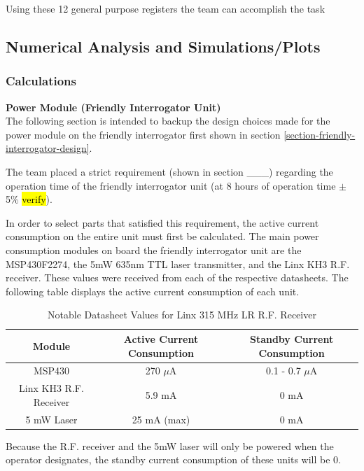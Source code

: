 \documentclass[letterpaper,10pt]{article}
\begin{document}
\begin{spacing}{1.15}
Using these 12 general purpose registers the team can accomplish the task 

\subsection{Numerical Analysis and Simulations/Plots} \label{section-simulations-calculations}

\subsubsection{Calculations}
\normalsize\textbf{Power Module (Friendly Interrogator Unit)} \\
The following section is intended to backup the design choices made for the power module on the friendly interrogator first shown in section \ref{section-friendly-interrogator-design}.

The team placed a strict requirement (shown in section \_\_\_) regarding the operation time of the friendly interrogator unit (at 8 hours of operation time $\pm$ 5\% \hl{verify}).

In order to select parts that satisfied this requirement, the active current consumption on the entire unit must first be calculated. The main power consumption modules on board the friendly interrogator unit are the MSP430F2274, the 5mW 635nm TTL laser transmitter, and the Linx KH3 R.F. receiver. These values were received from each of the respective datasheets. The following table displays the active current consumption of each unit. 


\begin{table}[htbp]
	\centering
	\begin{tabular}{c|c|c}	%
		\toprule	%
		Module & Active Current Consumption & Standby Current Consumption\\
		\midrule
		MSP430 & 270 $\mu$A & 0.1 - 0.7 $\mu$A\\ 
		Linx KH3 R.F. Receiver & 5.9 mA & 0 mA\\
		5 mW Laser & 25 mA (max) & 0 mA \\
	\bottomrule	%
	\end{tabular}%
	\caption{Notable Datasheet Values for Linx 315 MHz LR R.F. Receiver}
	\label{tab:table2}	%
\end{table}%

Because the R.F. receiver and the 5mW laser will only be powered when the operator designates, the standby current consumption of these units will be 0.


\end{spacing}
\end{document}
